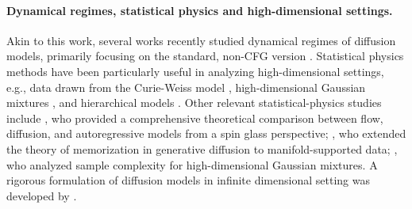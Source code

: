 \paragraph{Dynamical regimes, statistical physics and high-dimensional settings.} Akin to this work, several works recently studied dynamical regimes of diffusion models, primarily focusing on the standard, non-CFG version \citep{biroli2023generative,raya2024spontaneous,biroli2024dynamical,sclocchi2024phase,yu2024nonequilbrium,li2024critical,aranguri2025optimizing}. 
Statistical physics methods have been particularly useful in analyzing high-dimensional settings, e.g., data drawn from the Curie-Weiss model \citep{biroli2023generative}, high-dimensional Gaussian mixtures \citep{biroli2024dynamical}, and hierarchical models \citep{sclocchi2024phase}. 
Other relevant statistical-physics studies include \citet{ghio2024sampling}, who provided a comprehensive theoretical comparison between flow, diffusion, and autoregressive models from a spin glass perspective; \citet{achilli2024losing}, who extended the theory of memorization in generative diffusion to manifold-supported data; \citet{cui2025precise,cui2023analysis}, who analyzed sample complexity for 
high-dimensional Gaussian mixtures. A rigorous formulation of diffusion models in infinite dimensional setting was developed by \citet{pidstrigach2023infinitedimensionaldiffusionmodels}.  
 
